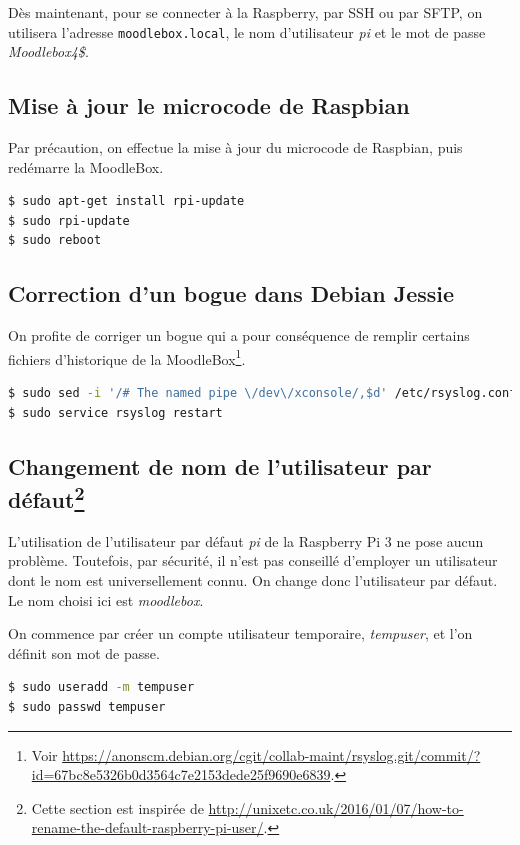 \documentclass[11pt]{article}
\begin{document}
Dès maintenant, pour se connecter à la Raspberry, par SSH ou par SFTP, on utilisera l'adresse \lstinline{moodlebox.local}, le nom d'utilisateur \emph{pi} et le mot de passe \emph{Moodlebox4\$}.

\subsection{Mise à jour le microcode de Raspbian}

Par précaution, on effectue la mise à jour du microcode de Raspbian, puis redémarre la MoodleBox.

\begin{lstlisting}[language=bash]
$ sudo apt-get install rpi-update
$ sudo rpi-update
$ sudo reboot
\end{lstlisting}

\subsection{Correction d'un bogue dans Debian Jessie}

On profite de corriger un bogue qui a pour conséquence de remplir certains fichiers d'historique de la MoodleBox\footnote{Voir \url{https://anonscm.debian.org/cgit/collab-maint/rsyslog.git/commit/?id=67bc8e5326b0d3564c7e2153dede25f9690e6839}.}.

\begin{lstlisting}[language=bash]
$ sudo sed -i '/# The named pipe \/dev\/xconsole/,$d' /etc/rsyslog.conf
$ sudo service rsyslog restart
\end{lstlisting}

\subsection[Changement de nom de l'utilisateur par défaut]{Changement de nom de l'utilisateur par défaut\footnote{Cette section est inspirée de \url{http://unixetc.co.uk/2016/01/07/how-to-rename-the-default-raspberry-pi-user/}.}}

L'utilisation de l'utilisateur par défaut \emph{pi} de la Raspberry Pi 3 ne pose aucun problème. Toutefois, par sécurité, il n'est pas conseillé d'employer un utilisateur dont le nom est universellement connu. On change donc l'utilisateur par défaut. Le nom choisi ici est \emph{moodlebox}.

On commence par créer un compte utilisateur temporaire, \emph{tempuser}, et l'on définit son mot de passe.
\begin{lstlisting}[language=bash]
$ sudo useradd -m tempuser
$ sudo passwd tempuser
\end{lstlisting}
\end{document}
